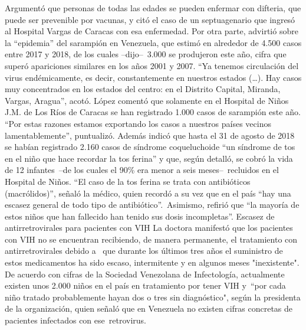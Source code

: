 \documentclass{article}%
\begin{document}
%
Argumentó que personas de todas las edades se pueden enfermar con difteria, que puede ser prevenible por vacunas, y citó el caso de un septuagenario que ingresó al Hospital Vargas de Caracas con esa enfermedad.%
\newline%
%
Por otra parte, advirtió sobre la “epidemia” del sarampión en Venezuela, que estimó en alrededor de 4.500 casos entre 2017 y 2018, de los cuales –dijo–~3.000 se produjeron este año, cifra que superó apariciones similares en los años 2001 y 2007.%
\newline%
%
“Ya tenemos circulación del virus endémicamente, es decir, constantemente en nuestros estados (…). Hay casos muy concentrados en los estados del centro: en el Distrito Capital, Miranda, Vargas, Aragua”, acotó.%
\newline%
%
López comentó que solamente en el Hospital de Niños J.M. de Los Ríos de Caracas se han registrado 1.000 casos de sarampión este año. \newline%
\newline%
“Por estas razones estamos exportando los casos a nuestros países vecinos lamentablemente”, puntualizó.%
\newline%
%
Además indicó que hasta el 31 de agosto de 2018 se habían registrado 2.160 casos de síndrome coqueluchoide “un síndrome de tos en el niño que hace recordar la tos ferina” y que, según detalló, se cobró la vida de 12 infantes~–de los cuales el 90\% era menor a seis meses–~recluidos en el Hospital de Niños.%
\newline%
%
“El caso de la tos ferina se trata con antibióticos (macrólidos)”, señaló la médico, quien recordó a su vez que en el país “hay una escasez general de todo tipo de antibiótico”.~Asimismo, refirió que “la mayoría de estos niños que han fallecido han tenido sus dosis incompletas”.%
\newline%
%
Escasez de antirretrovirales para pacientes con VIH%
\newline%
%
La doctora manifestó que los pacientes con VIH no se encuentran recibiendo, de manera permanente, el tratamiento con antirretrovirales debido a~ que durante los últimos tres años el suministro de estos medicamentos ha sido escaso, intermitente y en algunos meses "inexistente".%
\newline%
%
De acuerdo con cifras de la Sociedad Venezolana de Infectología, actualmente existen unos 2.000 niños en el país en tratamiento por tener VIH y~“por cada niño tratado probablemente hayan dos o tres sin diagnóstico", según la presidenta de la organización, quien señaló que en Venezuela no existen cifras concretas de pacientes infectados con ese~retrovirus.%
\end{document}
